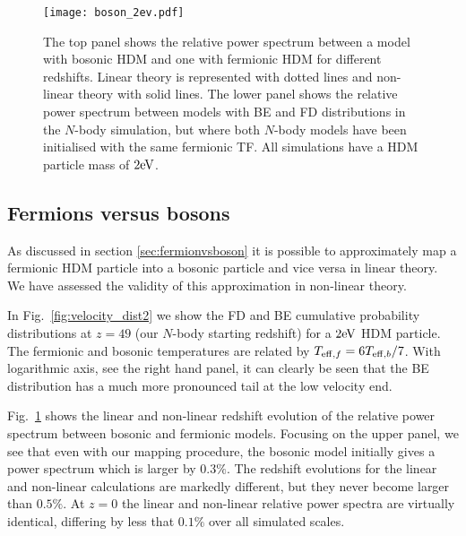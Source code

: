 \documentclass[11pt,a4paper]{article}
\renewcommand\({\left(}
\renewcommand\){\right)}
\renewcommand\[{\left[}
\renewcommand\]{\right]}
\begin{document}
 \begin{figure}[t]
  \vspace*{-4.0cm}
\begin{center}
\hspace*{-1.0cm}
\texttt{[image: boson\_2ev.pdf]}
\end{center}
 \vspace*{-4cm}
\caption{The top panel shows the relative power spectrum between a model with bosonic HDM and one with fermionic HDM for different redshifts. Linear theory is represented with dotted lines and non-linear theory with solid lines. The lower panel shows the relative power spectrum between models with BE and FD distributions in the $N$-body simulation, but where both $N$-body models have been initialised with the same fermionic TF.  All simulations have a HDM particle mass of $2{\rm eV}$.}
   \label{fig:nl_boson_2ev}
\end{figure}
\subsection{Fermions versus bosons}\label{sec:results_fvb}
As discussed in section \ref{sec:fermionvsboson} it is possible to approximately map a fermionic HDM particle into a bosonic particle and vice versa in linear theory. We have assessed the validity of this approximation in non-linear theory.

In Fig.~\ref{fig:velocity_dist2} we show the FD and BE cumulative probability distributions at $z=49$ (our $N$-body starting redshift) for a $2{\rm eV}$ HDM particle. The fermionic and bosonic temperatures are related by $T_{{\rm eff},f} = 6 T_{{\rm eff},b}/7$. With logarithmic axis, see the right hand panel, it can clearly be seen that the BE distribution has a much more pronounced tail at the low velocity end.

Fig.~\ref{fig:nl_boson_2ev} shows the linear and non-linear redshift evolution of the relative power spectrum between bosonic and fermionic models. Focusing on the upper panel, we see that even with our mapping procedure, the bosonic model initially gives a power spectrum which is larger by $0.3\%$. The redshift evolutions for the linear and non-linear calculations are markedly different, but they never become larger than $0.5\%$. At $z=0$ the linear and non-linear relative power spectra are virtually identical, differing by less that $0.1\%$ over all simulated scales.
\end{document}
